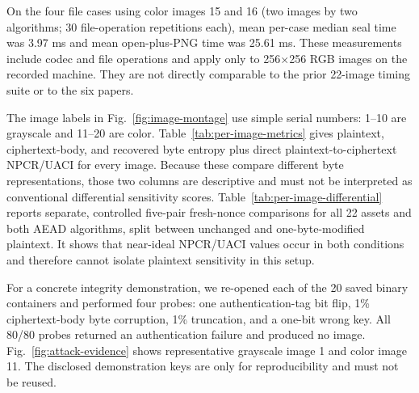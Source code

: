 \documentclass[letterpaper,journal]{IEEEtran}
\begin{document}
On the four file cases using color images 15 and 16 (two images by two algorithms; 30 file-operation repetitions each), mean per-case median seal time was 3.97 ms and mean open-plus-PNG time was 25.61 ms. These measurements include codec and file operations and apply only to 256$\times$256 RGB images on the recorded machine. They are not directly comparable to the prior 22-image timing suite or to the six papers.

The image labels in Fig.~\ref{fig:image-montage} use simple serial numbers: 1--10 are grayscale and 11--20 are color. Table~\ref{tab:per-image-metrics} gives plaintext, ciphertext-body, and recovered byte entropy plus direct plaintext-to-ciphertext NPCR/UACI for every image. Because these compare different byte representations, those two columns are descriptive and must not be interpreted as conventional differential sensitivity scores. Table~\ref{tab:per-image-differential} reports separate, controlled five-pair fresh-nonce comparisons for all 22 assets and both AEAD algorithms, split between unchanged and one-byte-modified plaintext. It shows that near-ideal NPCR/UACI values occur in both conditions and therefore cannot isolate plaintext sensitivity in this setup.

For a concrete integrity demonstration, we re-opened each of the 20 saved binary containers and performed four probes: one authentication-tag bit flip, 1\% ciphertext-body byte corruption, 1\% truncation, and a one-bit wrong key. All 80/80 probes returned an authentication failure and produced no image. Fig.~\ref{fig:attack-evidence} shows representative grayscale image 1 and color image 11. The disclosed demonstration keys are only for reproducibility and must not be reused.
\end{document}
